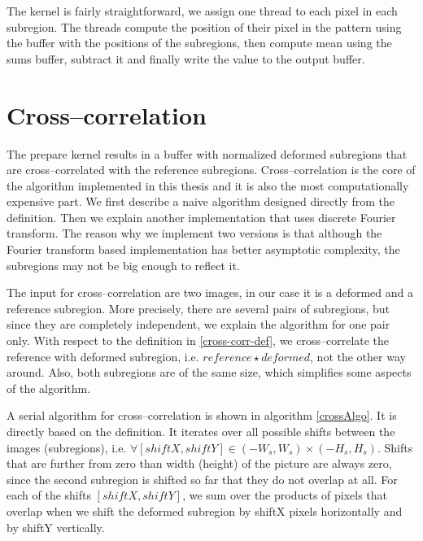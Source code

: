 The kernel is fairly straightforward, we assign one thread to each pixel in each subregion. The threads compute the position of their pixel in the pattern using the buffer with the positions of the subregions, then compute mean using the sums buffer, subtract it and finally write the value to the output buffer.




\section{Cross--correlation}
The prepare kernel results in a buffer with normalized deformed subregions that are cross--correlated with the reference subregions.
 Cross--correlation is the core of the algorithm implemented in this thesis and it is also the most computationally expensive part. We first describe a naive algorithm designed directly from the definition. Then we explain another implementation that uses discrete Fourier transform. The reason why we implement two versions is that although the Fourier transform based implementation has better asymptotic complexity, the subregions may not be big enough to reflect it.

The input for cross--correlation are two images, in our case it is a deformed and a reference subregion. More precisely, there are several pairs of subregions, but since they are completely independent, we explain the algorithm for one pair only. With respect to the definition in \cref{cross-corr-def}, we cross--correlate the reference with deformed subregion, i.e. $reference \star deformed$, not the other way around. Also, both subregions are of the same size, which simplifies some aspects of the algorithm.

A serial algorithm for cross--correlation is shown in algorithm \ref{crossAlgo}. It is directly based on the definition. It iterates over all possible shifts between the images (subregions), i.e. $\forall [shiftX, shiftY] \in (-W_s, W_s) \times (-H_s, H_s)$. Shifts that are further from zero than width (height) of the picture are always zero, since the second subregion is shifted so far that they do not overlap at all. For each of the shifts $[shiftX, shiftY]$, we sum over the products of pixels that overlap when we shift the deformed subregion by shiftX pixels horizontally and by shiftY vertically.



